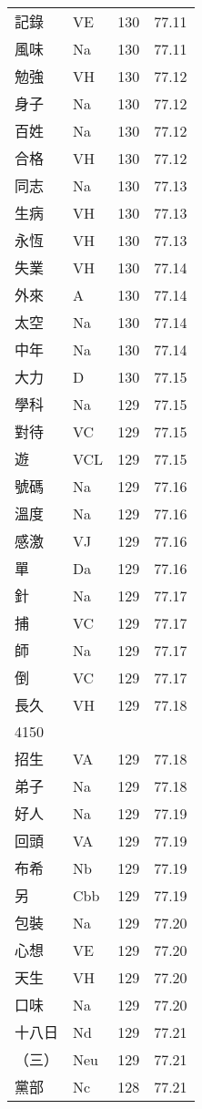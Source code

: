 \documentclass[twocolumn]{book}
\begin{document}
\begin{supertabular}{llrr}
記錄 & VE & 130 &  77.11\\
風味 & Na & 130 &  77.11\\
勉強 & VH & 130 &  77.12\\
身子 & Na & 130 &  77.12\\
百姓 & Na & 130 &  77.12\\
合格 & VH & 130 &  77.12\\
同志 & Na & 130 &  77.13\\
生病 & VH & 130 &  77.13\\
永恆 & VH & 130 &  77.13\\
失業 & VH & 130 &  77.14\\
外來 & A & 130 &  77.14\\
太空 & Na & 130 &  77.14\\
中年 & Na & 130 &  77.14\\
大力 & D & 130 &  77.15\\
學科 & Na & 129 &  77.15\\
對待 & VC & 129 &  77.15\\
遊 & VCL & 129 &  77.15\\
號碼 & Na & 129 &  77.16\\
溫度 & Na & 129 &  77.16\\
感激 & VJ & 129 &  77.16\\
單 & Da & 129 &  77.16\\
針 & Na & 129 &  77.17\\
捕 & VC & 129 &  77.17\\
師 & Na & 129 &  77.17\\
倒 & VC & 129 &  77.17\\
長久 & VH & 129 &  77.18\\
4150\\
招生 & VA & 129 &  77.18\\
弟子 & Na & 129 &  77.18\\
好人 & Na & 129 &  77.19\\
回頭 & VA & 129 &  77.19\\
布希 & Nb & 129 &  77.19\\
另 & Cbb & 129 &  77.19\\
包裝 & Na & 129 &  77.20\\
心想 & VE & 129 &  77.20\\
天生 & VH & 129 &  77.20\\
口味 & Na & 129 &  77.20\\
十八日 & Nd & 129 &  77.21\\
（三） & Neu & 129 &  77.21\\
黨部 & Nc & 128 &  77.21\\

\end{supertabular}
\end{document}
